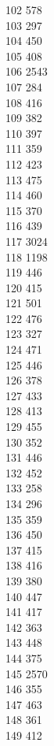 { 102	578 \\
 103	297 \\
 104	450 \\
 105	408 \\
 106	2543 \\
 107	284 \\
 108	416 \\
 109	382 \\
 110	397 \\
 111	359 \\
 112	423 \\
 113	475 \\
 114	460 \\
 115	370 \\
 116	439 \\
 117	3024 \\
 118	1198 \\
 119	446 \\
 120	415 \\
 121	501 \\
 122	476 \\
 123	327 \\
 124	471 \\
 125	446 \\
 126	378 \\
 127	433 \\
 128	413 \\
 129	455 \\
 130	352 \\
 131	446 \\
 132	452 \\
 133	258 \\
 134	296 \\
 135	359 \\
 136	450 \\
 137	415 \\
 138	416 \\
 139	380 \\
 140	447 \\
 141	417 \\
 142	363 \\
 143	448 \\
 144	375 \\
 145	2570 \\
 146	355 \\
 147	463 \\
 148	361 \\
 149	412 \\
}
